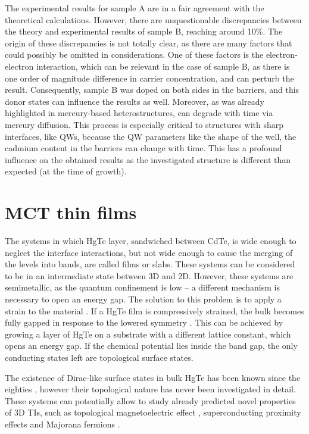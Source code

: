 \documentclass[titlepage,a4paper]{book}
\newcommand{\wciecie}{\quad\phantom{v}}
\begin{document}
The experimental results for sample A are in a fair agreement with the theoretical calculations. However, there are unquestionable discrepancies between the theory and experimental results of sample B, reaching around 10\%. The origin of these discrepancies is not totally clear, as there are many factors that could possibly be omitted in considerations. One of these factors is the electron-electron interaction, which can be relevant in the case of sample B, as there is one order of magnitude difference in carrier concentration, and can perturb the result. Consequently, sample B was doped on both sides in the barriers, and this donor states can influence the results as well. Moreover, as was already highlighted in \cite{Zholudev_MCT_QW} mercury-based heterostructures, can degrade with time via mercury diffusion. This process is especially critical to structures with sharp interfaces, like QWs, because the QW parameters like the shape of the well, the cadmium content in the barriers can change with time. This has a profound influence on the obtained results as the investigated structure is different than expected (at the time of growth).  

\clearpage
\section{MCT thin films}
\label{chpt:MCT_TF}
\wciecie
The systems in which HgTe layer, sandwiched between CdTe, is wide enough to neglect the interface interactions, but not wide enough to cause the merging of the levels into bands, are called films or slabs. These systems can be considered to be in an intermediate state between 3D and 2D. However, these systems are semimetallic, as the quantum confinement is low -- a different mechanism is necessary to open an energy gap. The solution to this problem is to apply a strain to the material \cite{Dai_MCT_layers}. If a HgTe film is compressively strained, the bulk becomes fully gapped in response to the lowered symmetry \cite{Brune_State2}. This can be achieved by growing a layer of HgTe on a substrate with a different lattice constant, which opens an energy gap. If the chemical potential lies inside the band gap, the only conducting states left are topological surface states. 

The existence of Dirac-like surface states in bulk HgTe has been known since the eighties \cite{Dyakonov_MCT_layers}\cite{Chang_MCT_layers}, however their topological nature has never been investigated in detail. These systems can potentially allow to study already predicted novel properties of 3D TIs, such as topological magnetoelectric effect \cite{Qi_MCT_layers}, superconducting proximity effects and Majorana fermions \cite{Oostinga_MCT_layers}\cite{Fu_MCT_layers}.
\end{document}
